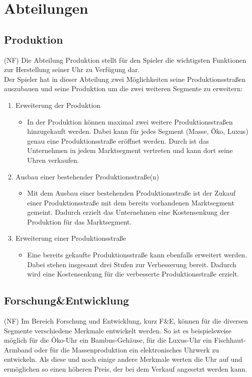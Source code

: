 \clearpage
\chapter{Abteilungen}
\section{Produktion}
(NF) Die Abteilung Produktion stellt für den Spieler die wichtigsten Funktionen zur Herstellung seiner Uhr zu Verfügung dar.\\ 
Der Spieler hat in dieser Abteilung zwei Möglichkeiten seine Produktionsstraßen auszubauen und seine Produktion um die zwei weiteren Segmente zu erweitern:
\begin{enumerate}
	\item Erweiterung der Produktion
\begin{itemize}
	\item In der Produktion können maximal zwei weitere Produktionsstraßen hinzugekauft werden. Dabei kann für jedes Segment (Masse, Öko, Luxus) genau eine Produktionsstraße eröffnet werden. Durch ist das Unternehmen in jedem Marktsegment vertreten und kann dort seine Uhren verkaufen.
\end{itemize}
	\item Ausbau einer bestehender Produktionsstraße(n)
\begin{itemize}
	\item Mit dem Ausbau einer bestehenden Produktionsstraße ist der Zukauf einer Produktionsstraße mit dem bereits vorhandenen Marktsegment gemeint. Dadurch erzielt das Unternehmen eine Kostensenkung der Produktion für das Marktsegment. 
\end{itemize}
	\item Erweiterung einer Produktionsstraße
\begin{itemize}
	\item Eine bereits gekaufte Produktionsstraße kann ebenfalls erweitert werden. Dabei stehen insgesamt drei Stufen zur Verbesserung bereit. Dadurch wird eine Kostensenkung für die verbesserte Produktionsstraße erzielt.   
\end{itemize}
\end{enumerate}
    
\section{Forschung\&Entwicklung}
(NF) Im Bereich Forschung und Entwicklung, kurz F\&E, können für die diversen Segmente verschiedene Merkmale entwickelt werden. So ist es beispielsweise möglich für die Öko-Uhr ein Bambus-Gehäuse, für die Luxus-Uhr ein Fischhaut-Armband oder für die Massenproduktion ein elektronisches Uhrwerk zu entwickeln. Als diese und noch einige andere Merkmale werten die Uhr auf und ermöglichen so einen höheren Preis, der bei dem Verkauf angesetzt werden kann.

